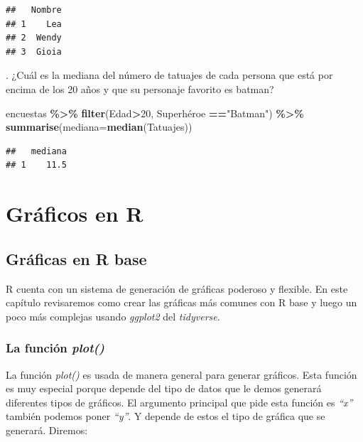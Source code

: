 \documentclass[
]{book}
\newenvironment{Shaded}{\begin{snugshade}}{\end{snugshade}}
\newcommand{\AttributeTok}[1]{\textcolor[rgb]{0.13,0.29,0.53}{#1}}
\newcommand{\DecValTok}[1]{\textcolor[rgb]{0.00,0.00,0.81}{#1}}
\newcommand{\FunctionTok}[1]{\textcolor[rgb]{0.13,0.29,0.53}{\textbf{#1}}}
\newcommand{\NormalTok}[1]{#1}
\newcommand{\SpecialCharTok}[1]{\textcolor[rgb]{0.81,0.36,0.00}{\textbf{#1}}}
\newcommand{\StringTok}[1]{\textcolor[rgb]{0.31,0.60,0.02}{#1}}
\begin{document}
\begin{verbatim}
##   Nombre
## 1    Lea
## 2  Wendy
## 3  Gioia
\end{verbatim}

\hfill{}.
¿Cuál es la mediana del número de tatuajes de cada persona que está por encima de los 20 años y que su personaje favorito es batman?\\

\begin{Shaded}
\begin{Highlighting}[]
\NormalTok{encuestas }\SpecialCharTok{\%\textgreater{}\%} \FunctionTok{filter}\NormalTok{(Edad}\SpecialCharTok{\textgreater{}}\DecValTok{20}\NormalTok{, Superhéroe }\SpecialCharTok{==}\StringTok{"Batman"}\NormalTok{) }\SpecialCharTok{\%\textgreater{}\%} \FunctionTok{summarise}\NormalTok{(}\AttributeTok{mediana=}\FunctionTok{median}\NormalTok{(Tatuajes))}
\end{Highlighting}
\end{Shaded}

\begin{verbatim}
##   mediana
## 1    11.5
\end{verbatim}

\chapter{Gráficos en R}\label{gruxe1ficos-en-r}

\section{Gráficas en R base}\label{gruxe1ficas-en-r-base}

R cuenta con un sistema de generación de gráficas poderoso y flexible.
En este capítulo revisaremos como crear las gráficas más comunes con R base y luego un poco más complejas usando \emph{ggplot2} del \emph{tidyverse}.

\subsection{\texorpdfstring{La función \emph{plot()}}{La función plot()}}\label{la-funciuxf3n-plot}

La función \emph{plot()} es usada de manera general para generar gráficos.
Esta función es muy especial porque depende del tipo de datos que le demos generará diferentes tipos de gráficos.
El argumento principal que pide esta función es \emph{``x''} también podemos poner \emph{``y''}.
Y depende de estos el tipo de gráfica que se generará.
Diremos:
\end{document}
